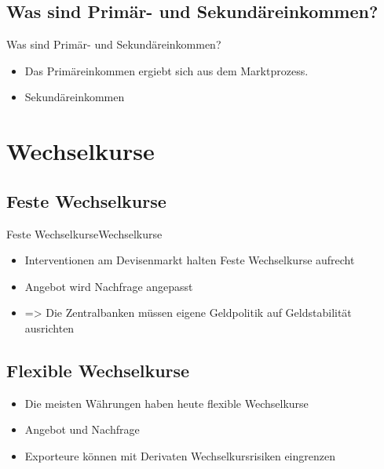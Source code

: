 \documentclass[10pt,a4paper, ngerman]{beamer}
\begin{document}
\subsection{Was sind Primär- und Sekundäreinkommen?}
\begin{frame}{Was sind Primär- und Sekundäreinkommen?}
\begin{itemize}
\item Das Primäreinkommen ergiebt sich aus dem Marktprozess. \pause
\item Sekundäreinkommen 
\end{itemize}
\end{frame}

\section{Wechselkurse}
\subsection{Feste Wechselkurse}
\begin{frame}{Feste Wechselkurse}{Wechselkurse}
\begin{itemize}
\item Interventionen am Devisenmarkt halten Feste Wechselkurse aufrecht \pause
\item Angebot wird Nachfrage angepasst \pause
\item => Die Zentralbanken müssen eigene Geldpolitik auf Geldstabilität ausrichten
\end{itemize}
\end{frame}

\subsection{Flexible Wechselkurse}
\begin{frame}
\begin{itemize}
\item Die meisten Währungen haben heute flexible Wechselkurse \pause
\item Angebot und Nachfrage \pause
\item Exporteure können mit Derivaten Wechselkursrisiken eingrenzen
\end{itemize}
\end{frame}
\end{document}

